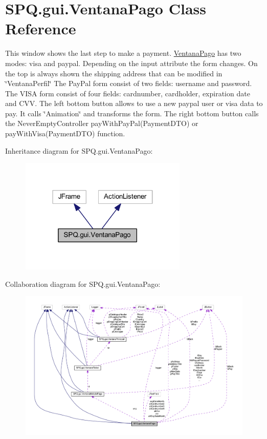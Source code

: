 \hypertarget{class_s_p_q_1_1gui_1_1_ventana_pago}{}\section{S\+P\+Q.\+gui.\+Ventana\+Pago Class Reference}
\label{class_s_p_q_1_1gui_1_1_ventana_pago}


This window shows the last step to make a payment. \mbox{\hyperlink{class_s_p_q_1_1gui_1_1_ventana_pago}{Ventana\+Pago}} has two modes\+: visa and paypal. Depending on the input attribute the form changes. On the top is always shown the shipping address that can be modified in \char`\"{}\+Ventana\+Perfil\char`\"{} The Pay\+Pal form consist of two fields\+: username and password. The V\+I\+SA form consist of four fields\+: cardnumber, cardholder, expiration date and C\+VV. The left bottom button allows to use a new paypal user or visa data to pay. It calls \char`\"{}\+Animation\char`\"{} and transforms the form. The right bottom button calls the Never\+Empty\+Controller pay\+With\+Pay\+Pal(\+Payment\+D\+T\+O) or pay\+With\+Visa(\+Payment\+D\+T\+O) function.  




Inheritance diagram for S\+P\+Q.\+gui.\+Ventana\+Pago\+:\nopagebreak
\begin{figure}[H]
\begin{center}
\leavevmode
\includegraphics[width=226pt]{class_s_p_q_1_1gui_1_1_ventana_pago__inherit__graph}
\end{center}
\end{figure}


Collaboration diagram for S\+P\+Q.\+gui.\+Ventana\+Pago\+:\nopagebreak
\begin{figure}[H]
\begin{center}
\leavevmode
\includegraphics[width=350pt]{class_s_p_q_1_1gui_1_1_ventana_pago__coll__graph}
\end{center}
\end{figure}
